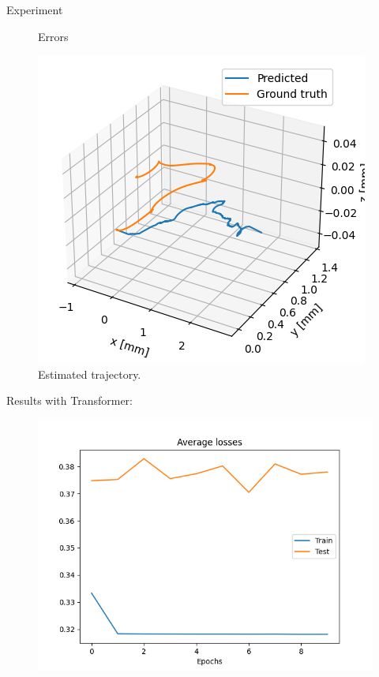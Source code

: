 \documentclass[aspectratio=169,t,xcolor=table]{beamer}
\begin{document}
\begin{frame}[allowframebreaks]{Experiment}
\begin{figure}[!htb]
\begin{center}
\begin{minipage}{0.45\textwidth}
            \caption{Errors}\label{graph1}
        \end{minipage}
        \hfill
        \begin{minipage}{0.45\textwidth}
            \centering
            \includegraphics[width=\linewidth]{../outputs/lstmTrajectory.png}
            \caption{Estimated trajectory.}\label{graph2}
        \end{minipage}
    \end{center}
\end{figure}
Results with Transformer:
\begin{figure}[!htb]
    \begin{center}
        \begin{minipage}{0.45\textwidth}
            \centering
            \includegraphics[width=\linewidth]{../outputs/transformerError.png}

\end{minipage}
\end{center}
\end{figure}
\end{frame}
\end{document}
